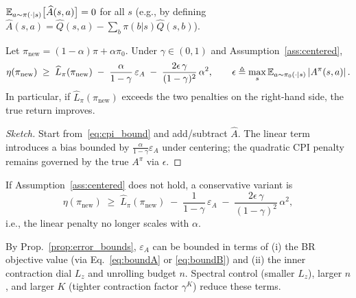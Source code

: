 \documentclass[11pt]{article}
\begin{document}
\begin{assumption}\label{ass:centered}
$\mathbb{E}_{a\sim\pi(\cdot|s)}\bigl[\widehat{A}(s,a)\bigr]=0$ for all $s$ (e.g., by defining $\widehat A(s,a)=\widehat Q(s,a)-\sum_b \pi(b|s)\widehat Q(s,b)$).
\end{assumption}

\begin{theorem}\label{thm:monotone_with_error}
Let $\pi_{\text{new}}=(1-\alpha)\pi+\alpha\pi_0$. Under $\gamma\in(0,1)$ and Assumption~\ref{ass:centered},
\begin{equation}
\eta(\pi_{\text{new}})\;\ge\; \widehat{L}_\pi(\pi_{\text{new}})
\;-\;\frac{\alpha}{1-\gamma}\,\varepsilon_A
\;-\;\frac{2\epsilon\,\gamma}{(1-\gamma)^2}\,\alpha^2,
\qquad \epsilon \triangleq \max_{s}\mathbb{E}_{a\sim\pi_0(\cdot|s)}\left\lvert A^\pi(s,a) \right\rvert.
\label{eq:main_theorem}
\end{equation}
In particular, if $\widehat{L}_\pi(\pi_{\text{new}})$ exceeds the two penalties on the right-hand side, the true return improves.
\end{theorem}
\begin{proof}[Sketch]
Start from~\eqref{eq:cpi_bound} and add/subtract $\widehat{A}$. The linear term introduces a bias bounded by $\frac{\alpha}{1-\gamma}\varepsilon_A$ under centering; the quadratic CPI penalty remains governed by the true $A^\pi$ via $\epsilon$.
\end{proof}

\begin{remark}
If Assumption~\ref{ass:centered} does not hold, a conservative variant is
\[
\eta(\pi_{\text{new}})\;\ge\; \widehat{L}_\pi(\pi_{\text{new}})
\;-\;\frac{1}{1-\gamma}\,\varepsilon_A
\;-\;\frac{2\epsilon\,\gamma}{(1-\gamma)^2}\,\alpha^2,
\]
i.e., the linear penalty no longer scales with $\alpha$.
\end{remark}

\begin{remark}
By Prop.~\ref{prop:error_bounds}, $\varepsilon_A$ can be bounded in terms of (i) the BR objective value (via Eq.~\eqref{eq:boundA} or \eqref{eq:boundB}) and (ii) the inner contraction dial $L_z$ and unrolling budget $n$. Spectral control (smaller $L_z$), larger $n$, and larger $K$ (tighter contraction factor $\gamma^K$) reduce these terms.
\end{remark}
\end{document}
